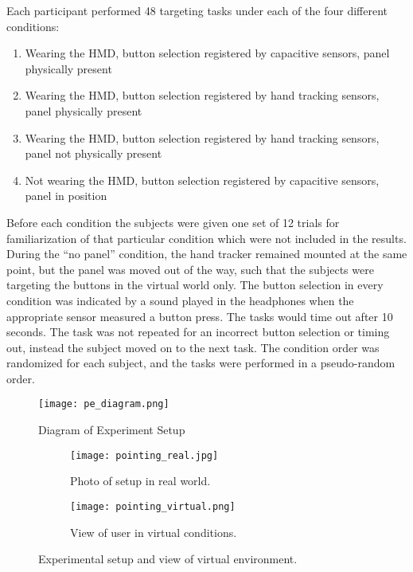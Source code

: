 Each participant performed 48 targeting tasks under each of the four different conditions:
\begin{enumerate}
    \item Wearing the HMD, button selection registered by capacitive sensors, panel physically present
    \item Wearing the HMD, button selection registered by hand tracking sensors, panel physically present
    \item Wearing the HMD, button selection registered by hand tracking sensors, panel not physically present
    \item Not wearing the HMD, button selection registered by capacitive sensors, panel in position
\end{enumerate}
Before each condition the subjects were given one set of 12 trials for familiarization of that particular condition which were not included in the results.
During the ``no panel'' condition, the hand tracker remained mounted at the same point, but the panel was moved out of the way, such that the subjects were targeting the buttons in the virtual world only.
The button selection in every condition was indicated by a sound played in the headphones when the appropriate sensor measured a button press.
The tasks would time out after 10 seconds.
The task was not repeated for an incorrect button selection or timing out, instead the subject moved on to the next task.
The condition order was randomized for each subject, and the tasks were performed in a pseudo-random order.

\begin{figure}
    \centering
    \texttt{[image: pe\_diagram.png]}
    \caption{Diagram of Experiment Setup}
    \label{fig:pe_diagram}
\end{figure}

\begin{figure}
    \centering
    \begin{subfigure}[t]{0.49\linewidth}
        \centering
        \texttt{[image: pointing\_real.jpg]}
        \caption{Photo of setup in real world.}
        \label{fig:p_setup:real}
    \end{subfigure}
    \begin{subfigure}[t]{0.49\linewidth}
        \centering
        \texttt{[image: pointing\_virtual.png]}
        \caption{View of user in virtual conditions.}
        \label{fig:p_setup:virtual}
    \end{subfigure}
    \caption{Experimental setup and view of virtual environment.}
    \label{fig:p_setup}
\end{figure}

